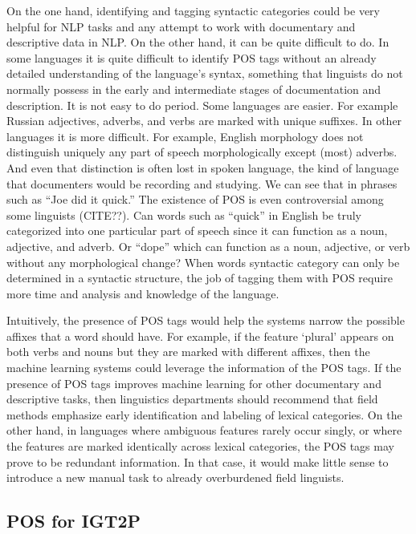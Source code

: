On the one hand, identifying and tagging syntactic categories could be very helpful for NLP tasks and any attempt to work with documentary and descriptive data in NLP. On the other hand, it can be quite difficult to do. In some languages it is quite difficult to identify POS tags without an already detailed understanding of the language's syntax, something that linguists do not normally possess in the early and intermediate stages of documentation and description. It is not easy to do period. Some languages are easier. For example Russian adjectives, adverbs, and verbs are marked with unique suffixes. In other languages it is more difficult. For example, English morphology does not distinguish uniquely any part of speech morphologically except (most) adverbs. And even that distinction is often lost in spoken language, the kind of language that documenters would be recording and studying. We can see that in phrases such as ``Joe did it quick.'' The existence of POS is even controversial among some linguists (CITE??). Can words such as ``quick'' in English be truly categorized into one particular part of speech since it can function as a noun, adjective, and adverb. Or ``dope'' which can function as a noun, adjective, or verb without any morphological change? When words syntactic category can only be determined in a syntactic structure, the job of tagging them with POS require more time and analysis and knowledge of the language.   

Intuitively, the presence of POS tags would help the systems narrow the possible affixes that a word should have. For example, if the feature `plural' appears on both verbs and nouns but they are marked with different affixes, then the machine learning systems could leverage the information of the POS tags. If the presence of POS tags improves machine learning for other documentary and descriptive tasks, then linguistics departments should recommend that field methods emphasize early identification and labeling of lexical categories. On the other hand, in languages where ambiguous features rarely occur singly, or where the features are marked identically across lexical categories, the POS tags may prove to be redundant information. In that case, it would make little sense to introduce a new manual task to already overburdened field linguists.


\subsection{POS for IGT2P}

